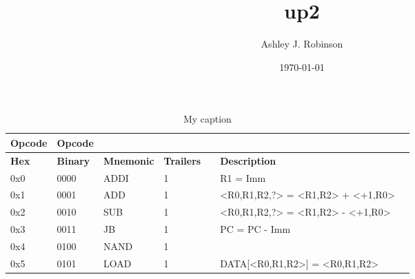 \documentclass[a4paper]{article}
\title{up2}
\author{Ashley J. Robinson}
\date{\today}
\begin{document}
\maketitle

\section{}


\begin{table}[]
    \centering
    \caption{My caption}
    \label{my-label}
    \begin{tabular}{|l|l|l|l|l|l|l|}
        \hline
        \textbf{Opcode}     &   \textbf{Opcode} &                       &                       &                       &                                       &           \\ \hline
        \textbf{Hex}        &   \textbf{Binary} &   \textbf{Mnemonic}   &   \textbf{Trailers}   &    &   \textbf{Description}                &           \\ \hline
        0x0                 &   0000            &   ADDI                &   1                   &               &   R1 = Imm        &           \\ \hline
        0x1                 &   0001            &   ADD                 &   1                   &               &   <R0,R1,R2,?> = <R1,R2> + <+1,R0>    &           \\ \hline
        0x2                 &   0010            &   SUB                 &   1                   &               &   <R0,R1,R2,?> = <R1,R2> - <+1,R0>           &           \\ \hline
        0x3                 &   0011            &   JB                &   1                   &               &   PC = PC - Imm           &           \\ \hline
        0x4                 &   0100            &   NAND                &  1             &           &           &           \\ \hline
        0x5                 &   0101            &   LOAD                &   1                   &              &   DATA[<R0,R1,R2>] = <R0,R1,R2>           &           \\ \hline

\end{tabular}
\end{table}
\end{document}
